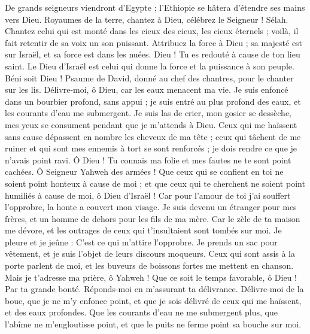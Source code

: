 \begin{multicols}{2}
De grands seigneurs viendront d'Egypte ; l'Ethiopie se hâtera d'étendre ses mains vers Dieu.
Royaumes de la terre, chantez à Dieu, célébrez le Seigneur ! Sélah.
Chantez celui qui est monté dans les cieux des cieux, les cieux éternels ; voilà, il fait retentir de sa voix un son puissant.
Attribuez la force à Dieu ; sa majesté est sur Israël, et sa force est dans les nuées.
Dieu ! Tu es redouté à cause de ton lieu saint. Le Dieu d'Israël est celui qui donne la force et la puissance à son peuple. Béni soit Dieu !
\VerseOne{}Psaume de David, donné au chef des chantres, pour le chanter sur les lis.
Délivre-moi, ô Dieu, car les eaux menacent ma vie.
Je suis enfoncé dans un bourbier profond, sans appui ; je suis entré au plus profond des eaux, et les courants d'eau me submergent.
Je suis las de crier, mon gosier se dessèche, mes yeux se consument pendant que je m'attends à Dieu.
Ceux qui me haïssent sans cause dépassent en nombre les cheveux de ma tête ; ceux qui tâchent de me ruiner et qui sont mes ennemis à tort se sont renforcés ; je dois rendre ce que je n'avais point ravi.
Ô Dieu ! Tu connais ma folie et mes fautes ne te sont point cachées.
Ô Seigneur Yahweh des armées ! Que ceux qui se confient en toi ne soient point honteux à cause de moi ; et que ceux qui te cherchent ne soient point humiliés à cause de moi, ô Dieu d'Israël !
Car pour l'amour de toi j'ai souffert l'opprobre, la honte a couvert mon visage.
Je suis devenu un étranger pour mes frères, et un homme de dehors pour les fils de ma mère.
Car le zèle de ta maison me dévore, et les outrages de ceux qui t'insultaient sont tombés sur moi.
Je pleure et je jeûne : C'est ce qui m'attire l'opprobre.
Je prends un sac pour vêtement, et je suis l'objet de leurs discours moqueurs.
Ceux qui sont assis à la porte parlent de moi, et les buveurs de boissons fortes me mettent en chanson.
Mais je t'adresse ma prière, ô Yahweh ! Que ce soit le temps favorable, ô Dieu ! Par ta grande bonté. Réponds-moi en m'assurant ta délivrance.
Délivre-moi de la boue, que je ne m'y enfonce point, et que je sois délivré de ceux qui me haïssent, et des eaux profondes.
Que les courants d'eau ne me submergent plus, que l'abîme ne m'engloutisse point, et que le puits ne ferme point sa bouche sur moi.

\end{multicols}
